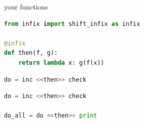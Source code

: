 \documentclass[aspectratio=169]{beamer}
\begin{document}
\begin{frame}
    \centering
        \Huge{ your functions}
\end{frame}

\begin{frame}[fragile]
    \begin{figure}[!h]
        \centering
    \end{figure}
\end{frame}

\begin{frame}[fragile]
    \begin{figure}[!h]
        \centering
    \end{figure}
\end{frame}

\begin{frame}[fragile,t]
    \begin{lstlisting}[language=Python]
from infix import shift_infix as infix

@infix
def then(f, g):
    return lambda x: g(f(x))
    \end{lstlisting}
\end{frame}

\begin{frame}[fragile,t]
    \begin{lstlisting}[language=Python]
do = inc <<then>> check
    \end{lstlisting}
\end{frame}

\begin{frame}[fragile,t]
    \begin{lstlisting}[language=Python]
do = inc <<then>> check

do_all = do <<then>> print
    \end{lstlisting}
\end{frame}
\end{document}
